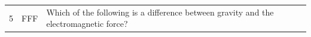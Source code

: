 \documentclass[10pt]{article}
\begin{document}
\begin{tiny}
\begin{longtable}{|r|p{0.375in}|p{1.275in}|p{3.5in}|}
5  &          FFF &                                                                                                                                                                                            Which of the following is a difference between gravity and the electromagnetic force? &                                                                                                                                                                                                                                                                                                                                                                                                                                                                                                                                                                                                                                                                                                                                                                                                                                                                                                                                                                                                                                                                                                                                                                                                                                                                                                                                                                                                                                                                                                                                                                                                                                                                                                                                                                                                                                                                                                                                                                                                                                                                                                                                                                                                                                                                                                                                                                                                                                                                                                                                                                                                                                                                                                                                                                                                                                                                                                                                                                                                                                                                                               
\end{longtable}
\end{tiny}
\end{document}
